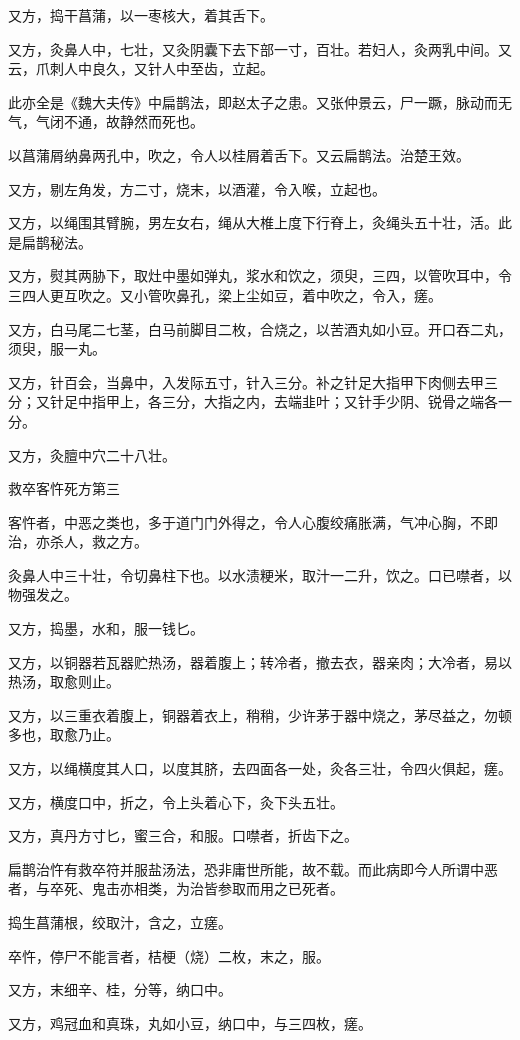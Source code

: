 \documentclass[12pt,UTF8]{ctexbook}
\begin{document}
又方，捣干菖蒲，以一枣核大，着其舌下。

又方，灸鼻人中，七壮，又灸阴囊下去下部一寸，百壮。若妇人，灸两乳中间。又云，爪刺人中良久，又针人中至齿，立起。

此亦全是《魏大夫传》中扁鹊法，即赵太子之患。又张仲景云，尸一蹶，脉动而无气，气闭不通，故静然而死也。

以菖蒲屑纳鼻两孔中，吹之，令人以桂屑着舌下。又云扁鹊法。治楚王效。

又方，剔左角发，方二寸，烧末，以酒灌，令入喉，立起也。

又方，以绳围其臂腕，男左女右，绳从大椎上度下行脊上，灸绳头五十壮，活。此是扁鹊秘法。

又方，熨其两胁下，取灶中墨如弹丸，浆水和饮之，须臾，三四，以管吹耳中，令三四人更互吹之。又小管吹鼻孔，梁上尘如豆，着中吹之，令入，瘥。

又方，白马尾二七茎，白马前脚目二枚，合烧之，以苦酒丸如小豆。开口吞二丸，须臾，服一丸。

又方，针百会，当鼻中，入发际五寸，针入三分。补之针足大指甲下肉侧去甲三分；又针足中指甲上，各三分，大指之内，去端韭叶；又针手少阴、锐骨之端各一分。

又方，灸膻中穴二十八壮。

救卒客忤死方第三

客忤者，中恶之类也，多于道门门外得之，令人心腹绞痛胀满，气冲心胸，不即治，亦杀人，救之方。

灸鼻人中三十壮，令切鼻柱下也。以水渍粳米，取汁一二升，饮之。口已噤者，以物强发之。

又方，捣墨，水和，服一钱匕。

又方，以铜器若瓦器贮热汤，器着腹上；转冷者，撤去衣，器亲肉；大冷者，易以热汤，取愈则止。

又方，以三重衣着腹上，铜器着衣上，稍稍，少许茅于器中烧之，茅尽益之，勿顿多也，取愈乃止。

又方，以绳横度其人口，以度其脐，去四面各一处，灸各三壮，令四火俱起，瘥。

又方，横度口中，折之，令上头着心下，灸下头五壮。

又方，真丹方寸匕，蜜三合，和服。口噤者，折齿下之。

扁鹊治忤有救卒符并服盐汤法，恐非庸世所能，故不载。而此病即今人所谓中恶者，与卒死、鬼击亦相类，为治皆参取而用之已死者。

捣生菖蒲根，绞取汁，含之，立瘥。

卒忤，停尸不能言者，桔梗（烧）二枚，末之，服。

又方，末细辛、桂，分等，纳口中。

又方，鸡冠血和真珠，丸如小豆，纳口中，与三四枚，瘥。
\end{document}
